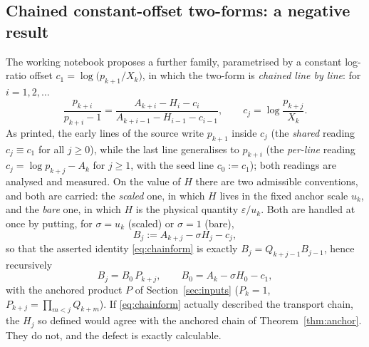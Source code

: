 \documentclass[11pt]{article}
\theoremstyle{remark}
\newcommand{\Xk}{X_k}
\newcommand{\Ak}{A_k}
\newcommand{\uk}{u_k}
\newcommand{\eps}{\varepsilon}
\begin{document}
\subsection{Chained constant-offset two-forms: a negative result}\label{subsec:chainform}

The working notebook proposes a further family, parametrised by a constant
log-ratio offset $c_1=\log\bigl(p_{k+1}/\Xk\bigr)$, in which the two-form is
\emph{chained line by line}: for $i=1,2,\dots$
\begin{equation}\label{eq:chainform}
\frac{p_{k+i}}{p_{k+i}-1}
=\frac{A_{k+i}-H_i-c_i}{A_{k+i-1}-H_{i-1}-c_{i-1}},
\qquad c_j=\log\frac{p_{k+j}}{\Xk}.
\end{equation}
As printed, the early lines of the source write $p_{k+1}$ inside $c_j$ (the
\emph{shared} reading $c_j\equiv c_1$ for all $j\ge0$), while the last line
generalises to $p_{k+i}$ (the \emph{per-line} reading
$c_j=\log p_{k+j}-\Ak$ for $j\ge1$, with the seed line $c_0:=c_1$); both
readings are analysed and measured. On the value of $H$ there are two
admissible conventions, and both are carried: the \emph{scaled} one, in
which $H$ lives in the fixed anchor scale $\uk$, and the \emph{bare} one,
in which $H$ is the physical quantity $\eps/\uk$. Both are handled at once
by putting, for $\sigma=\uk$ (scaled) or $\sigma=1$ (bare),
\[
B_j:=A_{k+j}-\sigma H_j-c_j,
\]
so that the asserted identity \eqref{eq:chainform} is exactly
$B_j=Q_{k+j-1}B_{j-1}$, hence recursively
\begin{equation}\label{eq:phantom}
B_j=B_0\,P_{k+j},\qquad
B_0=A_{k}-\sigma H_0-c_1,
\end{equation}
with the anchored product $P$ of Section~\ref{sec:inputs} ($P_{k}=1$,
$P_{k+j}=\prod_{m<j}Q_{k+m}$). If \eqref{eq:chainform} actually described
the transport chain, the $H_j$ so defined would agree with the anchored
chain of Theorem~\ref{thm:anchor}. They do not, and the defect is exactly
calculable.
\end{document}
